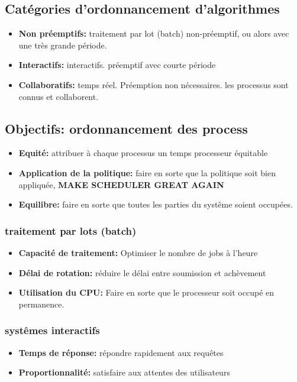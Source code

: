 \subsection{Catégories d'ordonnancement d'algorithmes}

\begin{itemize}
    \item \textbf{Non préemptifs: }traitement par lot (batch) non-préemptif, ou alors avec une très grande période.
    \item \textbf{Interactifs: }interactifs. préemptif avec courte période
    \item \textbf{Collaboratifs: }temps réel. Préemption non nécessaires. les processus sont connus et collaborent. 
\end{itemize}

\subsection{Objectifs: ordonnancement des process}
\begin{itemize}
    \item \textbf{Equité: }attribuer à chaque processus un temps processeur équitable
    \item \textbf{Application de la politique: }faire en sorte que la politique soit bien appliquée, \textbf{MAKE SCHEDULER GREAT AGAIN}
    \item \textbf{Equilibre: }faire en sorte que toutes les parties du systême soient occupées.
\end{itemize}

\subsubsection{traitement par lots (batch)}
\begin{itemize}
    \item \textbf{Capacité de traitement: }Optimiser le nombre de jobs à l'heure
    \item \textbf{Délai de rotation: }réduire le délai entre soumission et achèvement
    \item \textbf{Utilisation du CPU: }Faire en sorte que le processeur soit occupé en permanence.
\end{itemize}

\subsubsection{systêmes interactifs}
\begin{itemize}
    \item \textbf{Temps de réponse: }répondre rapidement aux requêtes
    \item \textbf{Proportionnalité: }satisfaire aux attentes des utilisateurs
\end{itemize}

